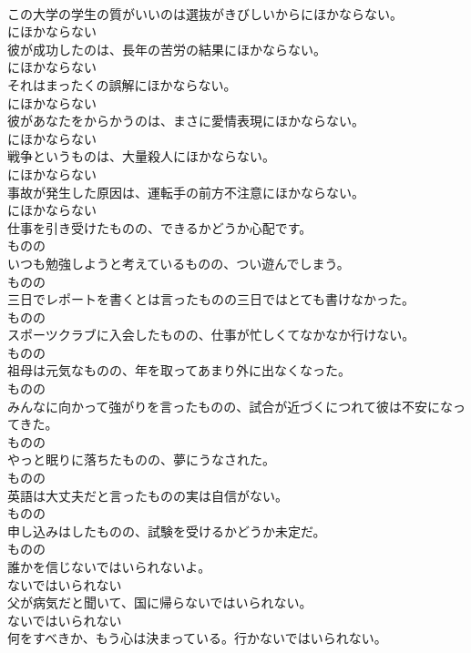 \documentclass[8pt]{extreport}
\begin{document}
\begin{CJK}{UTF8}{min}
\\	この大学の学生の質がいいのは選抜がきびしいからにほかならない。	
\\	にほかならない	
\\	彼が成功したのは、長年の苦労の結果にほかならない。	
\\	にほかならない	
\\	それはまったくの誤解にほかならない。	
\\	にほかならない	
\\	彼があなたをからかうのは、まさに愛情表現にほかならない。	
\\	にほかならない	
\\	戦争というものは、大量殺人にほかならない。	
\\	にほかならない	
\\	事故が発生した原因は、運転手の前方不注意にほかならない。	
\\	にほかならない	
\\	仕事を引き受けたものの、できるかどうか心配です。	
\\	ものの	
\\	いつも勉強しようと考えているものの、つい遊んでしまう。	
\\	ものの	
\\	三日でレポートを書くとは言ったものの三日ではとても書けなかった。	
\\	ものの	
\\	スポーツクラブに入会したものの、仕事が忙しくてなかなか行けない。	
\\	ものの	
\\	祖母は元気なものの、年を取ってあまり外に出なくなった。	
\\	ものの	
\\	みんなに向かって強がりを言ったものの、試合が近づくにつれて彼は不安になってきた。	
\\	ものの	
\\	やっと眠りに落ちたものの、夢にうなされた。	
\\	ものの	
\\	英語は大丈夫だと言ったものの実は自信がない。	
\\	ものの	
\\	申し込みはしたものの、試験を受けるかどうか未定だ。	
\\	ものの	
\\	誰かを信じないではいられないよ。	
\\	ないではいられない	
\\	父が病気だと聞いて、国に帰らないではいられない。	
\\	ないではいられない	
\\	何をすべきか、もう心は決まっている。行かないではいられない。	

\end{CJK}
\end{document}
